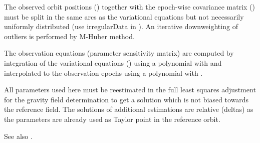 The observed orbit positions () together with the epoch-wise covariance matrix
() must be split in the same arcs as the variational equations but not
necessarily uniformly distributed (use irregularData in ). An iterative downweighting of
outliers is performed by M-Huber method.

The observation equations (parameter sensitivity matrix) are computed by integration of the variational equations
() using a polynomial with  and interpolated to the
observation epochs using a polynomial with .

All parameters used here must be reestimated in the full least squares adjustment
for the gravity field determination to get a solution which is not biased towards the reference field.
The solutions of additional estimations are relative (deltas) as the parameters are already used as Taylor point
in the reference orbit.

See also .


